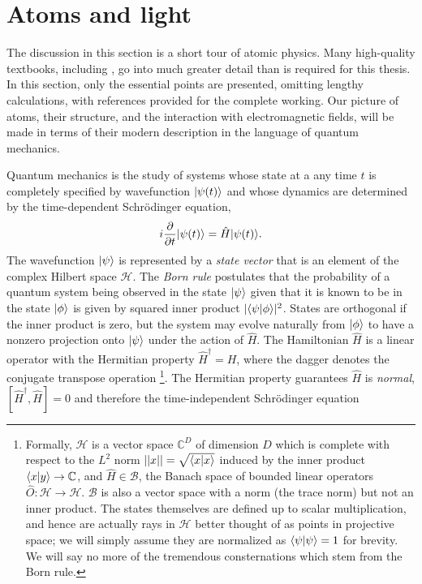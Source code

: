 \section{Atoms and light}

	The discussion in this section is a short tour of atomic physics. Many high-quality textbooks, including \cite{FootAtomic,BinneyBook}, go into much greater detail than is required for this thesis. In this section, only the essential points are presented, omitting lengthy calculations, with references provided for the complete working. Our picture of atoms, their structure, and the interaction with electromagnetic fields, will be made in terms of their modern description in the language of quantum mechanics.

	Quantum mechanics is the study of systems whose state at a any time $t$ is completely specified by wavefunction $|\psi(t)\rangle$ and whose dynamics are determined by the time-dependent Schr\"{o}dinger equation,
	\begin{equation}
		i\frac{\partial}{\partial t}|\psi(t)\rangle = \hat{H}|\psi(t)\rangle.
		\label{eqn:TDSE}
	\end{equation}
	The wavefunction $|\psi\rangle$ is represented by a \emph{state vector} that is an element of the complex Hilbert space $\mathcal{H}$. The \emph{Born rule} postulates that the probability of a quantum system being observed in the state $|\psi\rangle$ given that it is known to be in the state $|\phi\rangle$ is given by squared inner product $|\langle\psi|\phi\rangle|^2$. States are orthogonal if the inner product is zero, but the system may evolve naturally from $|\phi\rangle$ to have a nonzero projection onto $|\psi\rangle$ under the action of $\hat{H}$. The Hamiltonian $\hat{H}$ is a linear operator with the Hermitian property $\hat{H}^\dagger=H$, where the dagger denotes the conjugate transpose operation \footnote{Formally, $\mathcal{H}$ is a vector space $\mathbb{C}^D$ of dimension $D$ which is complete with respect to the $L^2$ norm $||x||=\sqrt{\langle x|x\rangle}$ induced by the inner product $\langle x|y\rangle\rightarrow\mathbb{C}$, and $\hat{H}\in\mathcal{B}$, the Banach space of bounded linear operators $\hat{O}:\mathcal{H}\rightarrow\mathcal{H}$. $\mathcal{B}$ is also a vector space with a norm (the trace norm) but not an inner product. The states themselves are defined up to scalar multiplication, and hence are actually rays in $\mathcal{H}$ better thought of as points in projective space; we will simply assume they are normalized as $\langle\psi|\psi\rangle=1$ for brevity. We will say no more of the tremendous consternations which stem from the Born rule.}.	The Hermitian property guarantees $\hat{H}$ is \emph{normal}, $[\hat{H}^\dagger, \hat{H}]=0$ and therefore the time-independent Schr\"{o}dinger equation
